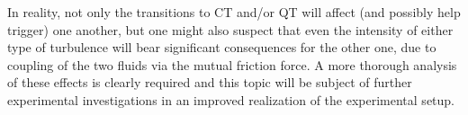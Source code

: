 In reality, not only the transitions to CT and/or QT will affect (and possibly help trigger) one another, but one might also suspect that even the intensity of either type of turbulence will bear significant consequences for the other one, due to coupling of the two fluids via the mutual friction force. A more thorough analysis of these effects is clearly required and this topic will be subject of further experimental investigations in an improved realization of the experimental setup.

\newpage
